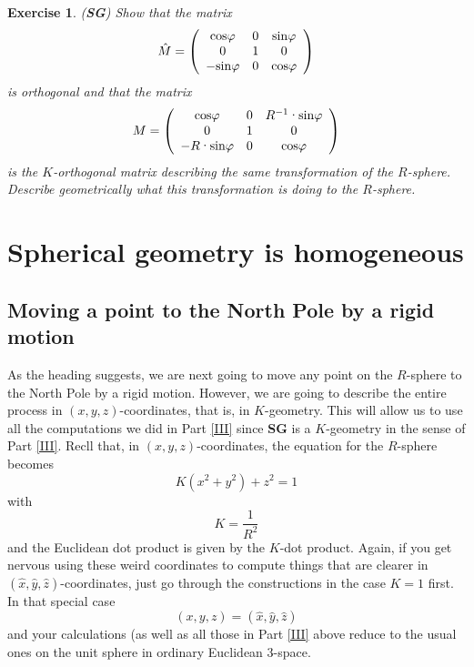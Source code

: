 \documentclass{article}%
\newtheorem{exercise}[theorem]{Exercise}
\begin{document}
\begin{exercise}
(\textbf{SG}) Show that the matrix%
\[
\hat{M}=\left(
\begin{array}
[c]{ccc}%
\mathrm{cos}\varphi & 0 & \mathrm{sin}\varphi\\
0 & 1 & 0\\
-\mathrm{sin}\varphi & 0 & \mathrm{cos}\varphi
\end{array}
\right)
\]
is orthogonal and that the matrix%
\[
M=\left(
\begin{array}
[c]{ccc}%
\mathrm{cos}\varphi & 0 & R^{-1}\text{\textperiodcentered}\mathrm{sin}%
\varphi\\
0 & 1 & 0\\
-R\text{\textperiodcentered}\mathrm{sin}\varphi & 0 & \mathrm{cos}\varphi
\end{array}
\right)
\]
is the $K$-orthogonal matrix describing the same transformation of the
$R$-sphere. Describe geometrically what this transformation is doing to the
$R$-sphere.
\end{exercise}

\pagebreak

\section{Spherical geometry is homogeneous}

\subsection{Moving a point to the North Pole by a rigid motion}

As the heading suggests, we are next going to move any point on the $R$-sphere
to the North Pole by a rigid motion. However, we are going to describe the
entire process in $\left(  x,y,z\right)  $-coordinates, that is, in
$K$-geometry. This will allow us to use all the computations we did in Part
\ref{III} since \textbf{SG} is a $K$-geometry in the sense of Part \ref{III}.
Recll that, in $\left(  x,y,z\right)  $-coordinates, the equation for the
$R$-sphere becomes%
\begin{equation}
K\left(  x^{2}+y^{2}\right)  +z^{2}=1 \label{72}%
\end{equation}
with%
\[
K=\frac{1}{R^{2}}%
\]
and the Euclidean dot product is given by the $K$-dot product. Again, if you
get nervous using these weird coordinates to compute things that are clearer
in $\left(  \hat{x},\hat{y},\hat{z}\right)  $-coordinates, just go through the
constructions in the case $K=1$ first. In that special case
\[
\left(  x,y,z\right)  =\left(  \hat{x},\hat{y},\hat{z}\right)
\]
and your calculations (as well as all those in Part \ref{III} above reduce to
the usual ones on the unit sphere in ordinary Euclidean $3$-space.
\end{document}
